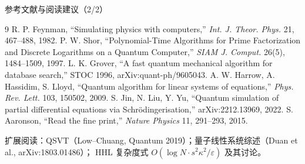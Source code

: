 \documentclass[aspectratio=169,10pt]{ctexbeamer}
\newcommand{\eps}{\varepsilon}
\begin{document}
\begin{frame}{参考文献与阅读建议（2/2）}
\scriptsize
\begin{thebibliography}{9}
 R. P. Feynman, ``Simulating physics with computers,'' \emph{Int. J. Theor. Phys.} 21, 467--488, 1982.
 P. W. Shor, ``Polynomial-Time Algorithms for Prime Factorization and Discrete Logarithms on a Quantum Computer,'' \emph{SIAM J. Comput.} 26(5), 1484--1509, 1997.
 L. K. Grover, ``A fast quantum mechanical algorithm for database search,'' STOC 1996, arXiv:quant-ph/9605043.
 A. W. Harrow, A. Hassidim, S. Lloyd, ``Quantum algorithm for linear systems of equations,'' \emph{Phys. Rev. Lett.} 103, 150502, 2009.
 S. Jin, N. Liu, Y. Yu, ``Quantum simulation of partial differential equations via Schrödingerisation,'' arXiv:2212.13969, 2022.
 S. Aaronson, ``Read the fine print,'' \emph{Nature Physics} 11, 291--293, 2015.
\end{thebibliography}
\vspace{1mm}
{\tiny\color{graytext}扩展阅读：QSVT（Low--Chuang, Quantum 2019）；量子线性系统综述（Duan et al., arXiv:1803.01486）；
HHL 复杂度式 $O(\log N\cdot s^2\kappa^2/\eps)$ 及其讨论。}
\end{frame}
\end{document}
